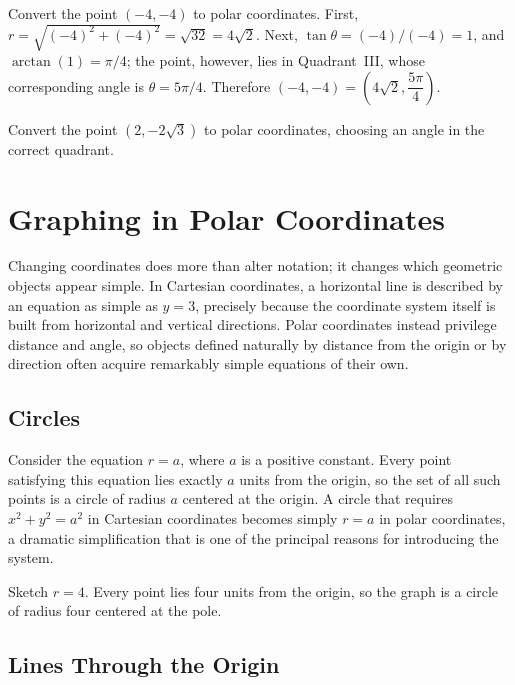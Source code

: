 \begin{example}
Convert the point $(-4,-4)$ to polar coordinates. First, $r =
\sqrt{(-4)^2+(-4)^2} = \sqrt{32} = 4\sqrt2$. Next, $\tan\theta =
(-4)/(-4) = 1$, and $\arctan(1) = \pi/4$; the point, however, lies in
Quadrant~III, whose corresponding angle is $\theta = 5\pi/4$. Therefore
$(-4,-4) = \left(4\sqrt2, \dfrac{5\pi}{4}\right)$.
\end{example}

\begin{practicenow}
Convert the point $(2,-2\sqrt3)$ to polar coordinates, choosing an angle
in the correct quadrant.
\end{practicenow}

\section{Graphing in Polar Coordinates}

Changing coordinates does more than alter notation; it changes which
geometric objects appear simple. In Cartesian coordinates, a horizontal
line is described by an equation as simple as $y=3$, precisely because
the coordinate system itself is built from horizontal and vertical
directions. Polar coordinates instead privilege distance and angle, so
objects defined naturally by distance from the origin or by direction
often acquire remarkably simple equations of their own.

\subsection*{Circles}

Consider the equation $r = a$, where $a$ is a positive constant. Every
point satisfying this equation lies exactly $a$ units from the origin, so
the set of all such points is a circle of radius $a$ centered at the
origin. A circle that requires $x^2+y^2 = a^2$ in Cartesian coordinates
becomes simply $r = a$ in polar coordinates, a dramatic simplification
that is one of the principal reasons for introducing the system.

\begin{example}
Sketch $r=4$. Every point lies four units from the origin, so the graph
is a circle of radius four centered at the pole.
\end{example}

\subsection*{Lines Through the Origin}

